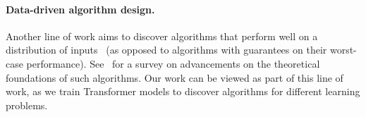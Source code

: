 \paragraph{Data-driven algorithm design.}
Another line of work aims to discover algorithms that perform well on a distribution of inputs~\citep{horvitz2001bayesian,xu2008satzilla,vinyals2015pointer,bello2016neural,khalil2017learning,selsam2018learning,schwarzschild2021can} (as opposed to algorithms with guarantees on their worst-case performance).
See~\citet{balcan2020data} for a survey on advancements on the theoretical foundations of such algorithms.
Our work can be viewed as part of this line of work, as we train Transformer models to discover algorithms for different learning problems.